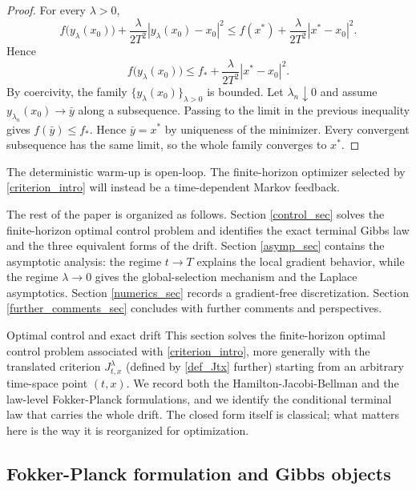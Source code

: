 \documentclass[11pt]{amsart}
\makeatletter
\renewcommand{\section}{\@startsection{section}{1}%
 \z@{.7\linespacing\@plus\linespacing}{.5\linespacing}%
 {\normalfont\large\bfseries\centering}} %
\renewcommand{\leq}{\leqslant}
\renewcommand{\Vert}{|}
\numberwithin{equation}{section}
\numberwithin{figure}{section}
\theoremstyle{definition}\newtheorem{remark}[theorem]{Remark}%
\makeatother
\begin{document}
\begin{proof}
For every $\lambda > 0$,
$$
f\big( y_\lambda(x_0) \big) + \frac{\lambda}{2T^2}\Vert y_\lambda(x_0) - x_0 \Vert^2 \leq f(x^*) + \frac{\lambda}{2T^2}\Vert x^* - x_0 \Vert^2.
$$
Hence
$$
f\big( y_\lambda(x_0) \big) \leq f_* + \frac{\lambda}{2T^2}\Vert x^* - x_0 \Vert^2.
$$
By coercivity, the family $\{ y_\lambda(x_0) \}_{\lambda > 0}$ is bounded. Let $\lambda_n \downarrow 0$ and assume $y_{\lambda_n}(x_0) \to \bar y$ along a subsequence. Passing to the limit in the previous inequality gives $f(\bar y) \leq f_*$. Hence $\bar y = x^*$ by uniqueness of the minimizer. Every convergent subsequence has the same limit, so the whole family converges to $x^*$.
\end{proof}

The deterministic warm-up is open-loop. The finite-horizon optimizer selected by \eqref{criterion_intro} will instead be a time-dependent Markov feedback. 

\medskip

The rest of the paper is organized as follows. Section \ref{control_sec} solves the finite-horizon optimal control problem and identifies the exact terminal Gibbs law and the three equivalent forms of the drift. Section \ref{asymp_sec} contains the asymptotic analysis: the regime $t \to T$ explains the local gradient behavior, while the regime $\lambda \to 0$ gives the global-selection mechanism and the Laplace asymptotics. Section \ref{numerics_sec} records a gradient-free discretization. Section \ref{further_comments_sec} concludes with further comments and perspectives.



\section{Optimal control and exact drift}\label{control_sec}
This section solves the finite-horizon optimal control problem associated with \eqref{criterion_intro}, more generally with the translated criterion 
$J^\lambda_{t,x}$ (defined by \eqref{def_Jtx} further) starting from an arbitrary time-space point $(t,x)$. We record both the Hamilton-Jacobi-Bellman and the law-level Fokker-Planck formulations, and we identify the conditional terminal law that carries the whole drift. The closed form itself is classical; what matters here is the way it is reorganized for optimization.

\subsection{Fokker-Planck formulation and Gibbs objects}
\end{document}
